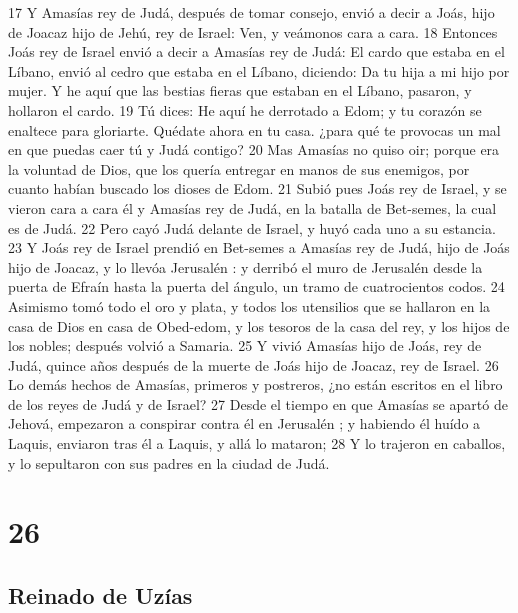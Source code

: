 17 Y Amasías rey de Judá, después de tomar consejo, envió a decir a Joás, hijo de Joacaz hijo de Jehú, rey de Israel: Ven, y veámonos cara a cara.
18 Entonces Joás rey de Israel envió a decir a Amasías rey de Judá: El cardo que estaba en el Líbano, envió al cedro que estaba en el Líbano, diciendo: Da tu hija a mi hijo por mujer. Y he aquí que las bestias fieras que estaban en el Líbano, pasaron, y hollaron el cardo.
19 Tú dices: He aquí he derrotado a Edom; y tu corazón se enaltece para gloriarte. Quédate ahora en tu casa. ¿para qué te provocas un mal en que puedas caer tú y Judá contigo?
20 Mas Amasías no quiso oir; porque era la voluntad de Dios, que los quería entregar en manos de sus enemigos, por cuanto habían buscado los dioses de Edom.
21 Subió pues Joás rey de Israel, y se vieron cara a cara él y Amasías rey de Judá, en la batalla de Bet-semes, la cual es de Judá.
22 Pero cayó Judá delante de Israel, y huyó cada uno a su estancia.
23 Y Joás rey de Israel prendió en Bet-semes a Amasías rey de Judá, hijo de Joás hijo de Joacaz, y lo  llevóa Jerusalén : y derribó el muro de Jerusalén  desde la puerta de Efraín hasta la puerta del ángulo, un tramo de cuatrocientos codos.
24 Asimismo tomó todo el oro y plata, y todos los utensilios que se hallaron en la casa de Dios en casa de Obed-edom, y los tesoros de la casa del rey, y los hijos de los nobles; después volvió a Samaria.
25 Y vivió Amasías hijo de Joás, rey de Judá, quince años después de la muerte de Joás hijo de Joacaz, rey de Israel.
26 Lo demás hechos de Amasías, primeros y postreros, ¿no están escritos en el libro de los reyes de Judá y de Israel?
27 Desde el tiempo en que Amasías se apartó de Jehová, empezaron a conspirar contra él en Jerusalén ; y habiendo él huído a Laquis, enviaron tras él a Laquis, y allá lo mataron;
28 Y lo trajeron en caballos, y lo sepultaron con sus padres en la ciudad de Judá.

\chapter{26}

\section*{Reinado de Uzías}

 

